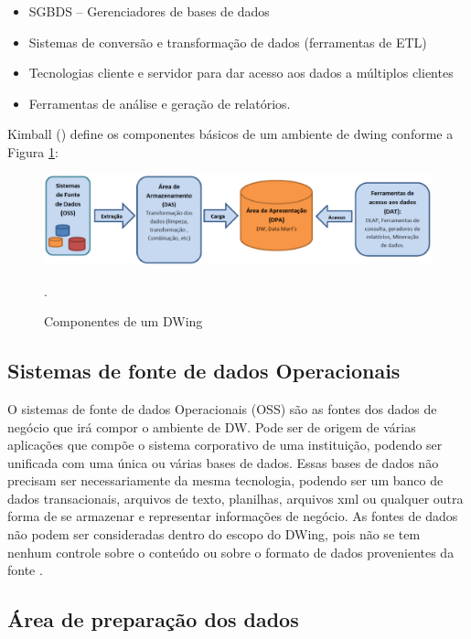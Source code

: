 %

\begin{itemize}
\item SGBDS – Gerenciadores de bases de dados
\item Sistemas de conversão e transformação de dados (ferramentas de ETL)
\item Tecnologias cliente e servidor para dar acesso aos dados a múltiplos clientes
\item Ferramentas de análise e geração de relatórios.
\end{itemize}

%

Kimball (\citeyear{kimball2002}) define os componentes básicos de um ambiente de dwing conforme a Figura \ref{componentesdw}:

%

 \begin{figure}[!htb]
 	\centering
 		\includegraphics[scale=0.5]{figuras/componentesDW}
 		\caption{Componentes de um DWing \cite{kimball2002}}.
 		\label{componentesdw}
 \end{figure}

%

\subsection{Sistemas de fonte de dados Operacionais}

O sistemas de fonte de dados Operacionais (OSS) são as fontes dos dados de negócio que irá compor o ambiente de DW. Pode ser de origem de várias aplicações que compõe o sistema corporativo de uma instituição, podendo ser unificada com uma única ou várias bases de dados.  Essas bases de dados não precisam ser necessariamente da mesma tecnologia, podendo ser um banco de dados transacionais, arquivos de texto, planilhas, arquivos xml ou qualquer outra forma de se armazenar e representar informações de negócio. As fontes de dados não podem ser consideradas dentro do escopo do DWing, pois  não se tem nenhum controle sobre o conteúdo ou sobre o formato de dados provenientes da fonte \cite{kimball2002}.

\subsection{Área de preparação dos dados}

